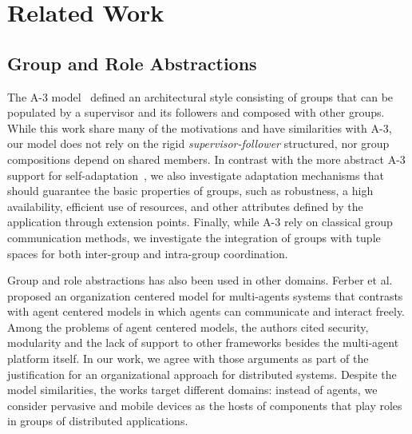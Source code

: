 \section{Related Work}\label{sec:related_work}

\subsection{Group and Role Abstractions}

The A-3 model~\cite{Baresi:2011:2} defined an architectural style consisting of groups that can be populated by a supervisor and its followers and composed with other groups. While this work share many of the motivations and have similarities with A-3, our model does not rely on the rigid \textit{supervisor-follower} structured, nor group compositions depend on shared members.
In contrast with the more abstract A-3 support for self-adaptation~\cite{Baresi:2011:2}, we also investigate adaptation mechanisms that should guarantee the basic properties of groups, such as robustness, a high availability, efficient use of resources, and other attributes defined by the application through extension points. Finally, while A-3 rely on classical group communication methods, we investigate the integration of groups with tuple spaces for both inter-group and intra-group coordination.

Group and role abstractions has also been used in other domains. Ferber et al.~\cite{Ferber:2004} proposed an organization centered model for multi-agents systems that contrasts with agent centered models in which agents can communicate and interact freely. Among the problems of agent centered models, the authors cited security, modularity and the lack of support to other frameworks besides the multi-agent platform itself. In our work, we agree with those arguments as part of the justification for an organizational approach for distributed systems. Despite the model similarities, the works target different domains: instead of agents, we consider pervasive and mobile devices as the hosts of components that play roles in groups of distributed applications. %

 
